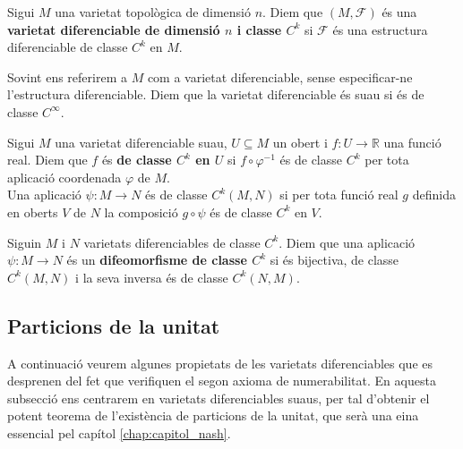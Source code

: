 \begin{defi}
    Sigui $M$ una varietat topològica de dimensió $n$. Diem que $(M, \mathcal F)$ és una \textbf{varietat diferenciable de dimensió $n$ i classe $C^k$} si $\mathcal F$ és una estructura diferenciable de classe $C^k$ en $M$.
\end{defi}

\begin{nota}
    Sovint ens referirem a $M$ com a varietat diferenciable, sense especificar-ne l'estructura diferenciable. Diem que la varietat diferenciable és suau si és de classe $C^\infty$.
\end{nota}

\begin{defi}
    Sigui $M$ una varietat diferenciable suau, $U\subseteq M$ un obert i $f:U\to\mathbb R$ una funció real. Diem que $f$ és \textbf{de classe $C^k$ en $U$} si $f\circ\varphi^{-1}$ és de classe $C^k$ per tota aplicació coordenada $\varphi$ de $M$.\\
    Una aplicació $\psi:M\to N$ és de classe $C^k(M,N)$ si per tota funció real $g$ definida en oberts $V$ de $N$ la composició $g\circ\psi$ és de classe $C^k$ en $V$.
\end{defi}

\begin{defi}
    Siguin $M$ i $N$ varietats diferenciables de classe $C^k$. Diem que una aplicació $\psi:M\to N$ és un \textbf{difeomorfisme de classe $C^k$} si és bijectiva, de classe $C^k(M,N)$ i la seva inversa és de classe $C^k(N,M)$.
\end{defi}

\subsection{Particions de la unitat}
A continuació veurem algunes propietats de les varietats diferenciables que es desprenen del fet que verifiquen el segon axioma de numerabilitat. En aquesta subsecció ens centrarem en varietats diferenciables suaus, per tal d'obtenir el potent teorema de l'existència de particions de la unitat, que serà una eina essencial pel capítol \ref{chap:capitol_nash}.

